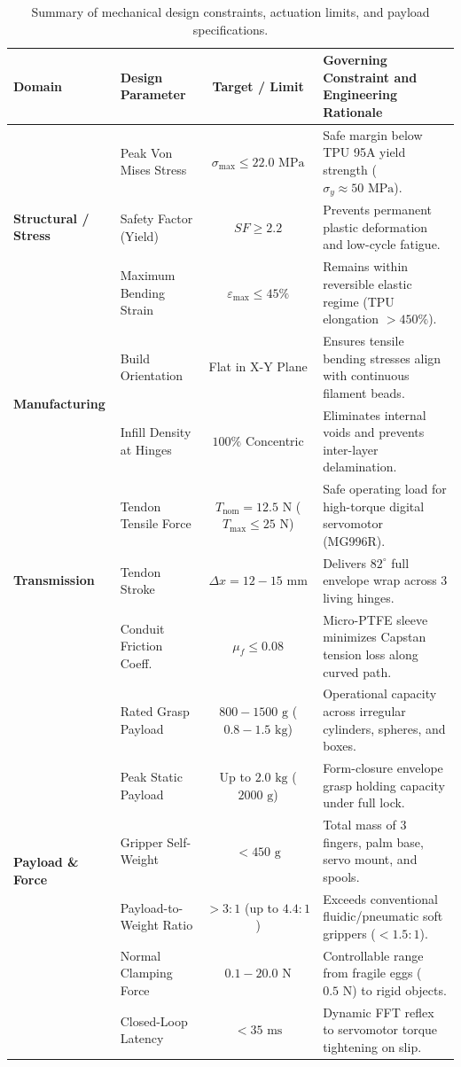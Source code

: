 \documentclass[12pt,a4paper]{report}
\begin{document}
\begin{table}[htbp]
\centering
\small
\caption{Summary of mechanical design constraints, actuation limits, and payload specifications.}
\label{tab:design_constraints}
\begin{tabularx}{\textwidth}{l l c X}
\toprule
\textbf{Domain} & \textbf{Design Parameter} & \textbf{Target / Limit} & \textbf{Governing Constraint and Engineering Rationale} \\
\midrule
\multirow{3}{*}{\textbf{Structural / Stress}} 
& Peak Von Mises Stress & $\sigma_{\text{max}} \le 22.0\text{ MPa}$ & Safe margin below TPU 95A yield strength ($\sigma_y \approx 50\text{ MPa}$). \\
& Safety Factor (Yield) & $SF \ge 2.2$ & Prevents permanent plastic deformation and low-cycle fatigue. \\
& Maximum Bending Strain & $\varepsilon_{\text{max}} \le 45\%$ & Remains within reversible elastic regime (TPU elongation $>450\%$). \\
\midrule
\multirow{2}{*}{\textbf{Manufacturing}} 
& Build Orientation & Flat in X-Y Plane & Ensures tensile bending stresses align with continuous filament beads. \\
& Infill Density at Hinges & $100\%$ Concentric & Eliminates internal voids and prevents inter-layer delamination. \\
\midrule
\multirow{3}{*}{\textbf{Transmission}} 
& Tendon Tensile Force & $T_{\text{nom}} = 12.5\text{ N}$ ($T_{\text{max}} \le 25\text{ N}$) & Safe operating load for high-torque digital servomotor (MG996R). \\
& Tendon Stroke & $\Delta x = 12 - 15\text{ mm}$ & Delivers $82^\circ$ full envelope wrap across 3 living hinges. \\
& Conduit Friction Coeff. & $\mu_f \le 0.08$ & Micro-PTFE sleeve minimizes Capstan tension loss along curved path. \\
\midrule
\multirow{6}{*}{\textbf{Payload \& Force}} 
& Rated Grasp Payload & $800 - 1500\text{ g}$ ($0.8 - 1.5\text{ kg}$) & Operational capacity across irregular cylinders, spheres, and boxes. \\
& Peak Static Payload & Up to $2.0\text{ kg}$ ($2000\text{ g}$) & Form-closure envelope grasp holding capacity under full lock. \\
& Gripper Self-Weight & $< 450\text{ g}$ & Total mass of 3 fingers, palm base, servo mount, and spools. \\
& Payload-to-Weight Ratio & $> 3:1$ (up to $4.4:1$) & Exceeds conventional fluidic/pneumatic soft grippers ($< 1.5:1$). \\
& Normal Clamping Force & $0.1 - 20.0\text{ N}$ & Controllable range from fragile eggs ($0.5\text{ N}$) to rigid objects. \\
& Closed-Loop Latency & $< 35\text{ ms}$ & Dynamic FFT reflex to servomotor torque tightening on slip. \\
\bottomrule
\end{tabularx}
\end{table}
\end{document}
